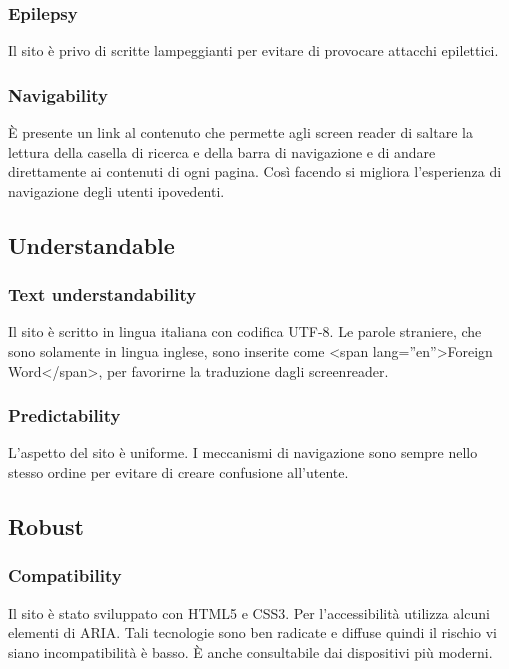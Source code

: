 \documentclass[10pt, a4paper]{article}
\begin{document}
		\subsubsection{Epilepsy}
		Il sito è privo di scritte lampeggianti per evitare di provocare attacchi epilettici.
		
		\subsubsection{Navigability}
		È presente un link al contenuto che permette agli screen reader di saltare la lettura della casella di ricerca e della barra di navigazione e di andare direttamente ai contenuti di ogni pagina. Così facendo si migliora l'esperienza di navigazione degli utenti ipovedenti.
	
	\subsection{Understandable}
		\subsubsection{Text understandability}
		Il sito è scritto in lingua italiana con codifica UTF-8. Le parole straniere, che sono solamente in lingua inglese, sono inserite come {<span lang=''en''>Foreign Word</span>}, per favorirne la traduzione dagli screenreader.
		
		\subsubsection{Predictability}
		L'aspetto del sito è uniforme. I meccanismi di navigazione sono sempre nello stesso ordine per evitare di creare confusione all'utente.
	
	\subsection{Robust}
		\subsubsection{Compatibility}
		Il sito è stato sviluppato con HTML5 e CSS3. Per l'accessibilità utilizza alcuni elementi di ARIA\cite{ARIA}. Tali tecnologie sono ben radicate e diffuse quindi il rischio vi siano incompatibilità è basso. È anche consultabile dai dispositivi più moderni.
\end{document}
